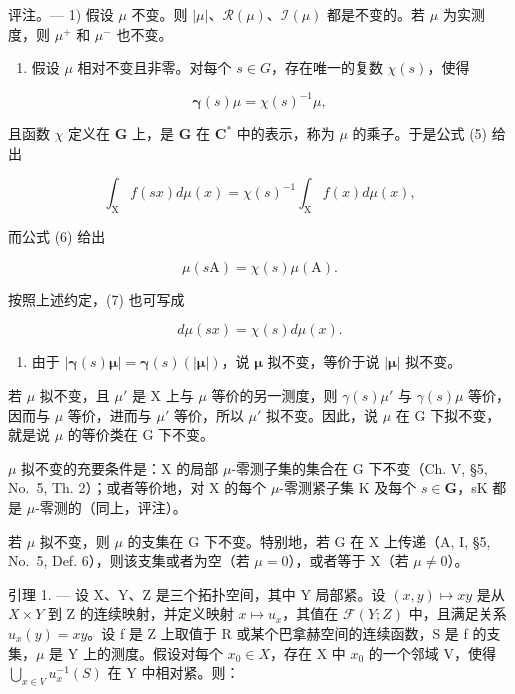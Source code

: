 评注。--- 1) 假设 \(\mu\) 不变。则 \(|\mu|\)、\(\mathcal{R}(\mu)\)、\(\mathcal{I}(\mu)\) 都是不变的。若 \(\mu\) 为实测度，则 \(\mu^{+}\) 和 \(\mu^{-}\) 也不变。

\begin{enumerate}
\def\labelenumi{\arabic{enumi})}
\setcounter{enumi}{1}
\tightlist
\item
  假设 \(\mu\) 相对不变且非零。对每个 \(s \in G\)，存在唯一的复数 \(\chi(s)\)，使得
\end{enumerate}

\[
\boldsymbol {\gamma} (s) \mu = \chi (s) ^ {- 1} \mu ,\tag{7}
\]

且函数 \(\chi\) 定义在 \(\mathbf{G}\) 上，是 \(\mathbf{G}\) 在 \(\mathbf{C}^*\) 中的表示，称为 \(\mu\) 的乘子。于是公式 (5) 给出

\[
\int_ {\mathrm{X}} f (s x) d \mu (x) = \chi (s) ^ {- 1} \int_ {\mathrm{X}} f (x) d \mu (x),\tag{8}
\]

而公式 (6) 给出

\[
\mu (s \mathrm{A}) = \chi (s) \mu (\mathrm{A}).\tag{9}
\]

按照上述约定，(7) 也可写成

\[
d \mu (s x) = \chi (s) d \mu (x).\tag{10}
\]

\begin{enumerate}
\def\labelenumi{\arabic{enumi})}
\setcounter{enumi}{2}
\tightlist
\item
  由于 \(|\pmb{\gamma}(s)\pmb{\mu}| = \pmb{\gamma}(s)(|\pmb{\mu}|)\)，说 \(\pmb{\mu}\) 拟不变，等价于说 \(|\pmb{\mu}|\) 拟不变。
\end{enumerate}

若 \(\mu\) 拟不变，且 \(\mu'\) 是 X 上与 \(\mu\) 等价的另一测度，则 \(\gamma(s)\mu'\) 与 \(\gamma(s)\mu\) 等价，因而与 \(\mu\) 等价，进而与 \(\mu'\) 等价，所以 \(\mu'\) 拟不变。因此，说 \(\mu\) 在 G 下拟不变，就是说 \(\mu\) 的等价类在 G 下不变。

\(\mu\) 拟不变的充要条件是：X 的局部 \(\mu\)-零测子集的集合在 G 下不变（Ch. V, §5, No.~5, Th. 2）；或者等价地，对 X 的每个 \(\mu\)-零测紧子集 K 及每个 \(s \in \mathbf{G}\)，sK 都是 \(\mu\)-零测的（同上，评注）。

若 \(\mu\) 拟不变，则 \(\mu\) 的支集在 G 下不变。特别地，若 G 在 X 上传递（A, I, §5, No.~5, Def. 6），则该支集或者为空（若 \(\mu = 0\)），或者等于 X（若 \(\mu \neq 0\)）。

引理 1. --- 设 X、Y、Z 是三个拓扑空间，其中 Y 局部紧。设 \((x,y)\mapsto xy\) 是从 \(X\times Y\) 到 Z 的连续映射，并定义映射 \(x\mapsto u_{x}\)，其值在 \(\mathcal{F}(Y;Z)\) 中，且满足关系 \(u_{x}(y)=xy\)。设 f 是 Z 上取值于 R 或某个巴拿赫空间的连续函数，S 是 f 的支集，\(\mu\) 是 Y 上的测度。假设对每个 \(x_{0}\in X\)，存在 X 中 \(x_{0}\) 的一个邻域 V，使得 \(\bigcup_{x\in V}u_{x}^{-1}(S)\) 在 Y 中相对紧。则：

